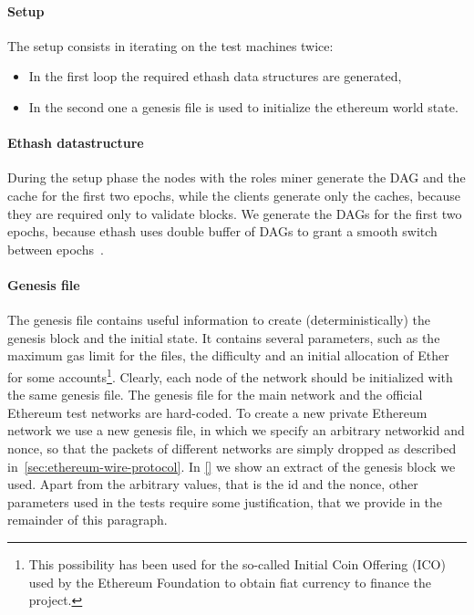 \paragraph{Setup}
The setup consists in iterating on the test machines twice:
\begin{itemize}
\item In the first loop the required ethash data structures are generated,
\item In the second one a genesis file is used to initialize the
ethereum world state.
\end{itemize}


\paragraph{Ethash datastructure}

During the setup phase the nodes with the roles miner generate the
DAG and the cache for the first two epochs, while the clients generate only
the caches, because they are required only to validate blocks.
We generate the DAGs for the first two epochs, because ethash uses double
buffer of DAGs to grant a smooth switch between
epochs~\cite{bib:dagger-hashimoto}.



\paragraph{Genesis file}

The genesis file contains useful information to create (deterministically)
the genesis block and the initial state. It contains several parameters, such as
the maximum gas limit for the files, the difficulty and an initial allocation of
Ether for some accounts\footnote{This possibility has been used for the
so-called Initial Coin Offering (ICO) used by the Ethereum Foundation to obtain
fiat currency to finance the project.}. Clearly, each node of the network should
be initialized with the same genesis file. The genesis file for the main network
and the official Ethereum test networks are hard-coded. To create a new private
Ethereum network we use a new genesis file, in which we specify an arbitrary
networkid and nonce, so that the packets of different networks are simply
dropped as described in~\autoref{sec:ethereum-wire-protocol}.
In \autoref{} we show an extract of the genesis block we used.
Apart from the arbitrary values, that is the id and the nonce, other parameters
used in the tests require some justification, that we provide in the remainder
of this paragraph.

